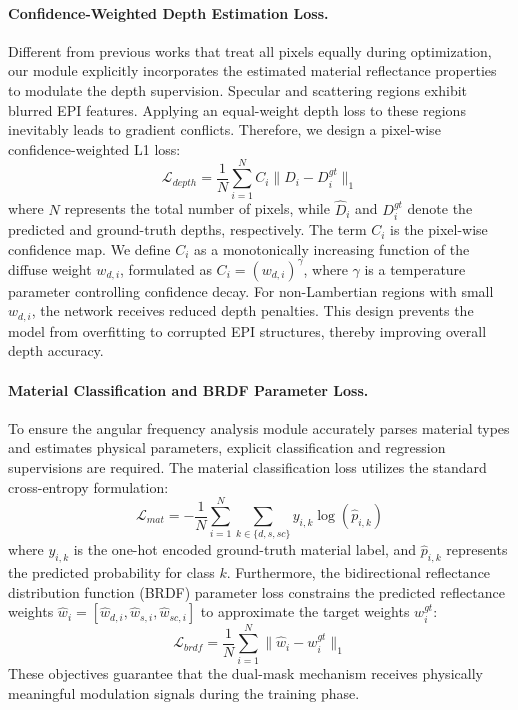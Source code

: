 \documentclass[lettersize,journal]{IEEEtran}
\begin{document}
\paragraph{Confidence-Weighted Depth Estimation Loss.}
Different from previous works that treat all pixels equally during optimization, our module explicitly incorporates the estimated material reflectance properties to modulate the depth supervision. Specular and scattering regions exhibit blurred EPI features. Applying an equal-weight depth loss to these regions inevitably leads to gradient conflicts. Therefore, we design a pixel-wise confidence-weighted L1 loss:
\begin{equation}
\label{eq:eq12}
\mathcal{L}_{depth} = \frac{1}{N} \sum_{i=1}^{N} C_i \| \hat{D}_i - D_i^{gt} \|_1
\end{equation}
where $N$ represents the total number of pixels, while $\hat{D}_i$ and $D_i^{gt}$ denote the predicted and ground-truth depths, respectively. The term $C_i$ is the pixel-wise confidence map. We define $C_i$ as a monotonically increasing function of the diffuse weight $w_{d,i}$, formulated as $C_i = (w_{d,i})^\gamma$, where $\gamma$ is a temperature parameter controlling confidence decay. For non-Lambertian regions with small $w_{d,i}$, the network receives reduced depth penalties. This design prevents the model from overfitting to corrupted EPI structures, thereby improving overall depth accuracy.

\paragraph{Material Classification and BRDF Parameter Loss.}
To ensure the angular frequency analysis module accurately parses material types and estimates physical parameters, explicit classification and regression supervisions are required. The material classification loss utilizes the standard cross-entropy formulation:
\begin{equation}
\label{eq:eq13}
\mathcal{L}_{mat} = -\frac{1}{N} \sum_{i=1}^{N} \sum_{k \in \{d, s, sc\}} y_{i,k} \log(\hat{p}_{i,k})
\end{equation}
where $y_{i,k}$ is the one-hot encoded ground-truth material label, and $\hat{p}_{i,k}$ represents the predicted probability for class $k$. Furthermore, the bidirectional reflectance distribution function (BRDF) parameter loss constrains the predicted reflectance weights $\hat{w}_i = [\hat{w}_{d,i}, \hat{w}_{s,i}, \hat{w}_{sc,i}]$ to approximate the target weights $w_i^{gt}$:
\begin{equation}
\label{eq:eq14}
\mathcal{L}_{brdf} = \frac{1}{N} \sum_{i=1}^{N} \| \hat{w}_i - w_i^{gt} \|_1
\end{equation}
These objectives guarantee that the dual-mask mechanism receives physically meaningful modulation signals during the training phase.
\end{document}
